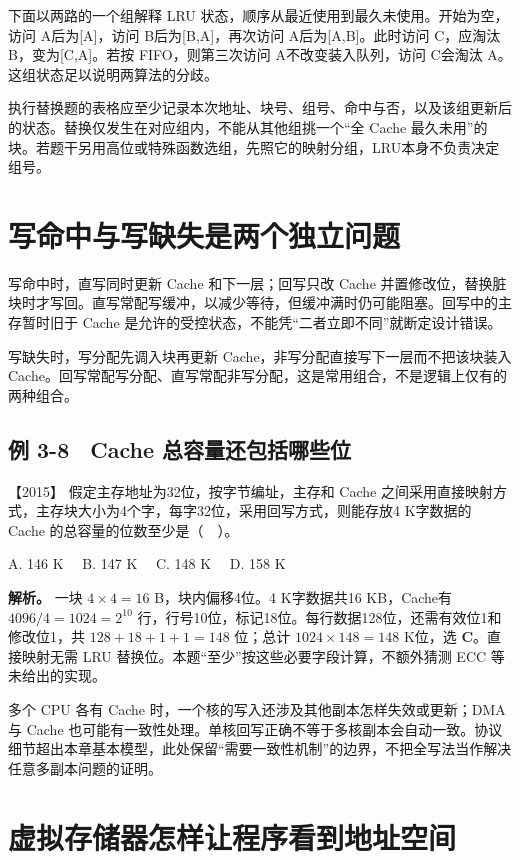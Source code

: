 下面以两路的一个组解释 LRU 状态，顺序从最近使用到最久未使用。开始为空，访问 A后为{[}A{]}，访问 B后为{[}B,A{]}，再次访问 A后为{[}A,B{]}。此时访问 C，应淘汰 B，变为{[}C,A{]}。若按 FIFO，则第三次访问 A不改变装入队列，访问 C会淘汰 A。这组状态足以说明两算法的分歧。

执行替换题的表格应至少记录本次地址、块号、组号、命中与否，以及该组更新后的状态。替换仅发生在对应组内，不能从其他组挑一个``全 Cache 最久未用''的块。若题干另用高位或特殊函数选组，先照它的映射分组，LRU本身不负责决定组号。

\section{写命中与写缺失是两个独立问题}\label{co-03-10}

写命中时，直写同时更新 Cache 和下一层；回写只改 Cache 并置修改位，替换脏块时才写回。直写常配写缓冲，以减少等待，但缓冲满时仍可能阻塞。回写中的主存暂时旧于 Cache 是允许的受控状态，不能凭``二者立即不同''就断定设计错误。

写缺失时，写分配先调入块再更新 Cache，非写分配直接写下一层而不把该块装入 Cache。回写常配写分配、直写常配非写分配，这是常用组合，不是逻辑上仅有的两种组合。

\subsection{例 3-8　Cache 总容量还包括哪些位}\label{co-ex3-8}

\noindent{}【2015】 假定主存地址为32位，按字节编址，主存和 Cache 之间采用直接映射方式，主存块大小为4个字，每字32位，采用回写方式，则能存放4 K字数据的 Cache 的总容量的位数至少是（　）。

A. 146 K　 B. 147 K　 C. 148 K　 D. 158 K


\textbf{解析。} 一块 \(4\times4=16\) B，块内偏移4位。4 K字数据共16 KB，Cache有 \(4096/4=1024=2^{10}\) 行，行号10位，标记18位。每行数据128位，还需有效位1和修改位1，共 \(128+18+1+1=148\) 位；总计 \(1024\times148=148\) K位，选 \textbf{C}。直接映射无需 LRU 替换位。本题``至少''按这些必要字段计算，不额外猜测 ECC 等未给出的实现。

多个 CPU 各有 Cache 时，一个核的写入还涉及其他副本怎样失效或更新；DMA 与 Cache 也可能有一致性处理。单核回写正确不等于多核副本会自动一致。协议细节超出本章基本模型，此处保留``需要一致性机制''的边界，不把全写法当作解决任意多副本问题的证明。

\section{虚拟存储器怎样让程序看到地址空间}\label{co-03-11}

